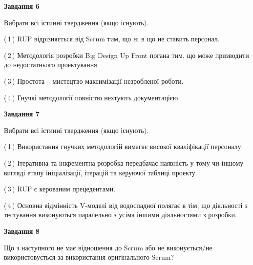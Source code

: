 \documentclass[10pt, ukrainian]{article}
\begin{document}
{\begin {large}
\newpage

{\begin {center}\textbf{Завдання 6}\end {center}}\par
Вибрати всі істинні твердження (якщо існують).\par
\vspace{2mm}



(\,1\,) RUP відрізняється від Scrum тим, що ні в що не ставить персонал.%



(\,2\,) Методологія розробки Big Design Up Front погана тим, що може призводити до недостатнього проектування.%



(\,3\,) Простота – мистецтво максимізації незробленої роботи. %



(\,4\,) Гнучкі методології повністю нехтують документацією. %


{\begin {center}\textbf{Завдання 7}\end {center}}\par
Вибрати всі істинні твердження (якщо існують).\par
\vspace{2mm}



(\,1\,) Використання гнучких методологій вимагає високої кваліфікації персоналу. %



(\,2\,) Ітеративна та інкрементна розробка передбачає наявність у тому чи іншому вигляді етапу ініціалізації, ітерацій та керуючої таблиці проекту. %



(\,3\,) RUP є керованим прецедентами. %



(\,4\,) Основна відмінність V-моделі від водоспадної полягає в тім, що діяльності з тестування виконуються паралельно з усіма іншими діяльностями з розробки. %


{\begin {center}\textbf{Завдання 8}\end {center}}\par
Що з наступного не має відношення до Scrum або не виконується/не використовується за використання оригінального Scrum?\par
\vspace{2mm}




\end{large}}
\end{document}
